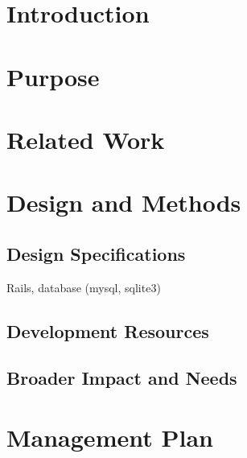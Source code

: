 \documentclass{article}
\begin{document}
%


%

%
\section{Introduction}

\section{Purpose}

\section{Related Work}

\section{Design and Methods}
\subsection{Design Specifications}
Rails, database (mysql, sqlite3)

\subsection{Development Resources}

\subsection{Broader Impact and Needs}

\section{Management Plan}
\end{document}
